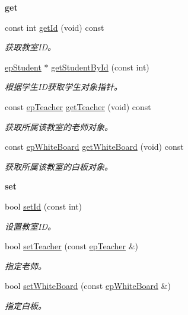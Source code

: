 \begin{Indent}{\bf get}\par
\begin{DoxyCompactItemize}
\item 
const int \hyperlink{classepClassroom_ab80acd528ac699d9e3abd6e378069f12}{get\-Id} (void) const 
\begin{DoxyCompactList}\small\item\em 获取教室\-I\-D。 \end{DoxyCompactList}\item 
\hyperlink{classepStudent}{ep\-Student} $\ast$ \hyperlink{classepClassroom_aef522cb3af881dcbbb0533175f2d9797}{get\-Student\-By\-Id} (const int)
\begin{DoxyCompactList}\small\item\em 根据学生\-I\-D获取学生对象指针。 \end{DoxyCompactList}\item 
const \hyperlink{classepTeacher}{ep\-Teacher} \hyperlink{classepClassroom_ad75b51a8e7995ecc563c2b3c6e83463b}{get\-Teacher} (void) const 
\begin{DoxyCompactList}\small\item\em 获取所属该教室的老师对象。 \end{DoxyCompactList}\item 
const \hyperlink{classepWhiteBoard}{ep\-White\-Board} \hyperlink{classepClassroom_a6beaf5ce968bc07bdbd530b46c226e9f}{get\-White\-Board} (void) const 
\begin{DoxyCompactList}\small\item\em 获取所属该教室的白板对象。 \end{DoxyCompactList}\end{DoxyCompactItemize}
\end{Indent}
\begin{Indent}{\bf set}\par
\begin{DoxyCompactItemize}
\item 
bool \hyperlink{classepClassroom_a62e05f8975b26c54137af02edc31cee1}{set\-Id} (const int)
\begin{DoxyCompactList}\small\item\em 设置教室\-I\-D。 \end{DoxyCompactList}\item 
bool \hyperlink{classepClassroom_a132a424a7dda5f6b0ee5efaaf46fbe71}{set\-Teacher} (const \hyperlink{classepTeacher}{ep\-Teacher} \&)
\begin{DoxyCompactList}\small\item\em 指定老师。 \end{DoxyCompactList}\item 
bool \hyperlink{classepClassroom_ae39337f3b583727b4198f1413ad25a44}{set\-White\-Board} (const \hyperlink{classepWhiteBoard}{ep\-White\-Board} \&)
\begin{DoxyCompactList}\small\item\em 指定白板。 \end{DoxyCompactList}\end{DoxyCompactItemize}
\end{Indent}
